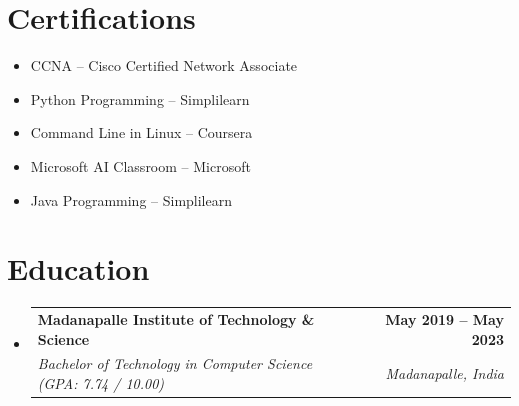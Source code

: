 \documentclass[letterpaper,11pt]{article}
\makeatletter
\newcommand{\resumeSubheading}[4]{
  \vspace{-2pt}\item
    \begin{tabular*}{1.0\textwidth}[t]{l@{\extracolsep{\fill}}r}
      \textbf{\large#1} & \textbf{\small #2} \\
      \textit{\large#3} & \textit{\small #4} \\
     
    \end{tabular*}\vspace{-7pt}
}
\newcommand{\resumeSubHeadingListStart}{\begin{itemize}[leftmargin=0.0in, label={}]}
\newcommand{\resumeSubHeadingListEnd}{\end{itemize}}
\makeatother
\begin{document}
\section{Certifications}
\begin{itemize}[leftmargin=0.2cm, itemsep=1pt]
    \item CCNA -- Cisco Certified Network Associate
    \item Python Programming -- Simplilearn
    \item Command Line in Linux -- Coursera
    \item Microsoft AI Classroom -- Microsoft
    \item Java Programming -- Simplilearn
\end{itemize}
\vspace{6pt}

\section{Education}
\resumeSubHeadingListStart
  \resumeSubheading
    {Madanapalle Institute of Technology \& Science}{May 2019 -- May 2023}
    {Bachelor of Technology in Computer Science (GPA: 7.74 / 10.00)}{Madanapalle, India}
\resumeSubHeadingListEnd
\end{document}
